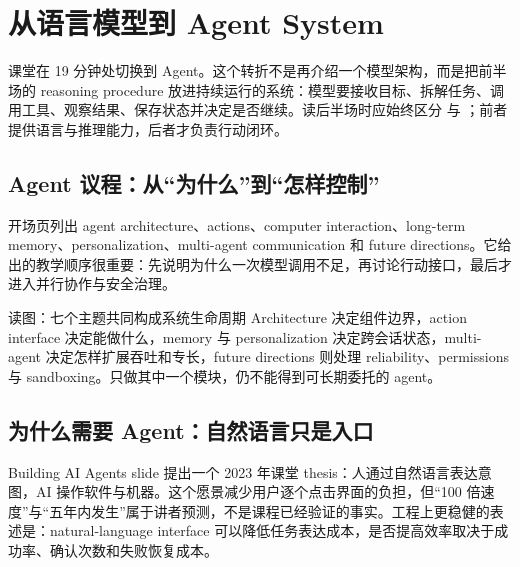 \section{从语言模型到 Agent System}

课堂在 19 分钟处切换到 Agent。这个转折不是再介绍一个模型架构，而是把前半场的 reasoning procedure 放进持续运行的系统：模型要接收目标、拆解任务、调用工具、观察结果、保存状态并决定是否继续。读后半场时应始终区分  与 ；前者提供语言与推理能力，后者才负责行动闭环。

\subsection{Agent 议程：从“为什么”到“怎样控制”}

开场页列出 agent architecture、actions、computer interaction、long-term memory、personalization、multi-agent communication 和 future directions。它给出的教学顺序很重要：先说明为什么一次模型调用不足，再讨论行动接口，最后才进入并行协作与安全治理。


\begin{knowledgebox}{读图：七个主题共同构成系统生命周期}
Architecture 决定组件边界，action interface 决定能做什么，memory 与 personalization 决定跨会话状态，multi-agent 决定怎样扩展吞吐和专长，future directions 则处理 reliability、permissions 与 sandboxing。只做其中一个模块，仍不能得到可长期委托的 agent。
\end{knowledgebox}


\subsection{为什么需要 Agent：自然语言只是入口}

Building AI Agents slide 提出一个 2023 年课堂 thesis：人通过自然语言表达意图，AI 操作软件与机器。这个愿景减少用户逐个点击界面的负担，但“100 倍速度”与“五年内发生”属于讲者预测，不是课程已经验证的事实。工程上更稳健的表述是：natural-language interface 可以降低任务表达成本，是否提高效率取决于成功率、确认次数和失败恢复成本。


